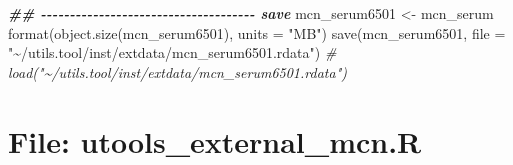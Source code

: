 \documentclass[
]{article}
\newenvironment{Shaded}{\begin{snugshade}}{\end{snugshade}}
\newcommand{\AttributeTok}[1]{\textcolor[rgb]{0.77,0.63,0.00}{#1}}
\newcommand{\CommentTok}[1]{\textcolor[rgb]{0.56,0.35,0.01}{\textit{#1}}}
\newcommand{\DocumentationTok}[1]{\textcolor[rgb]{0.56,0.35,0.01}{\textbf{\textit{#1}}}}
\newcommand{\FunctionTok}[1]{\textcolor[rgb]{0.00,0.00,0.00}{#1}}
\newcommand{\NormalTok}[1]{#1}
\newcommand{\OtherTok}[1]{\textcolor[rgb]{0.56,0.35,0.01}{#1}}
\newcommand{\StringTok}[1]{\textcolor[rgb]{0.31,0.60,0.02}{#1}}
\begin{document}
\begin{Shaded}
\begin{Highlighting}[]
\DocumentationTok{\#\# {-}{-}{-}{-}{-}{-}{-}{-}{-}{-}{-}{-}{-}{-}{-}{-}{-}{-}{-}{-}{-}{-}{-}{-}{-}{-}{-}{-}{-}{-}{-}{-}{-}{-}{-}{-}{-} save}
\NormalTok{mcn\_serum6501 }\OtherTok{\textless{}{-}}\NormalTok{ mcn\_serum}
\FunctionTok{format}\NormalTok{(}\FunctionTok{object.size}\NormalTok{(mcn\_serum6501), }\AttributeTok{units =} \StringTok{"MB"}\NormalTok{)}
\FunctionTok{save}\NormalTok{(mcn\_serum6501, }\AttributeTok{file =} \StringTok{"\textasciitilde{}/utils.tool/inst/extdata/mcn\_serum6501.rdata"}\NormalTok{)}
\CommentTok{\# load("\textasciitilde{}/utils.tool/inst/extdata/mcn\_serum6501.rdata")}
\end{Highlighting}
\end{Shaded}

\hypertarget{file-utools_external_mcn.r}{%
\section{File: utools\_external\_mcn.R}\label{file-utools_external_mcn.r}}
\end{document}
